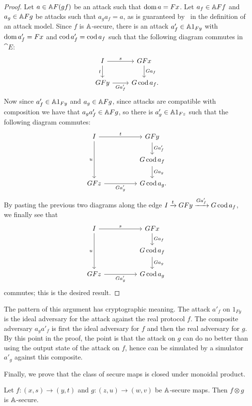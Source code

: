 \begin{proof}
  Let $a\in\AA F(gf)$ be an attack such that $\dom a = Fx$. Let
  $a_f\in\AA Ff$ and $a_g\in\AA Fg$ be attacks such that $a_ga_f = a$, as is
  guaranteed by~ in the definition of an attack
  model. Since $f$ is $\AA$-secure, there is an attack
  $a_f'\in\AA 1_{Fy}$ with $\dom a_f' = Fx$ and $\cod a_f'
  = \cod a_f$ such that the following diagram commutes in $\cat{E}$: \[
    \begin{tikzcd}
      I\ar[r, "s"]\ar[d, "t"'] & GFx\ar[d, "Ga_f"]\\
      GFy\ar[r, "Ga_f'"'] & G\cod a_f\punctuation{.}
    \end{tikzcd}
  \]
  Now since $a'_f\in\AA 1_{Fy}$ and $a_g\in\AA Fg$, since attacks are
  compatible with composition we have that $a_ga_f'\in\AA Fg$, so there is
  $a_g'\in \AA 1_{Fz}$ such that the following diagram commutes: \[
    \begin{tikzcd}
      I\ar[rr, "t"]\ar[dd, "u"'] && GFy\ar[d, "Ga_f'"]\\
                                && G\cod a_f\ar[d, "Ga_g"] \\
      GFz\ar[rr, "Ga_g'"'] && G\cod a_g\punctuation{.}
    \end{tikzcd}
  \] By pasting the previous two diagrams along the edge $I\xto{t}
  GFy\xto{Ga'_f} G\cod a_f$, we finally see that \[
    \begin{tikzcd}
      I\ar[rr, "s"]\ar[dd, "u"'] && GFx\ar[d, "Ga_f"]\\
                                && G\cod a_f\ar[d, "Ga_g"] \\
      GFz\ar[rr, "Ga_g'"'] && G\cod a_g
    \end{tikzcd}
  \]commutes; this is the desired result.
\end{proof}

The pattern of this argument has cryptographic meaning. The attack $a'_f$ on
$1_{Fy}$ is the ideal adversary for the attack against the real protocol $f$.
The composite adversary $a_ga'_f$ is first the ideal adversary for $f$ and then
the real adversary for $g$. By this point in the proof, the point is that the
attack on $g$ can do no better than using the output state of the attack on
$f$, hence can be simulated by a simulator $a'_g$ against this composite.

Finally, we prove that the class of secure maps is closed under monoidal
product.

\begin{lemma}\label{thm:closed-under-monoidal}
  Let $f: (x, s)\to (y, t)$ and $g: (z, u)\to (w, v)$ be $\AA$-secure maps.
  Then $f\otimes g$ is $\AA$-secure.
\end{lemma}

